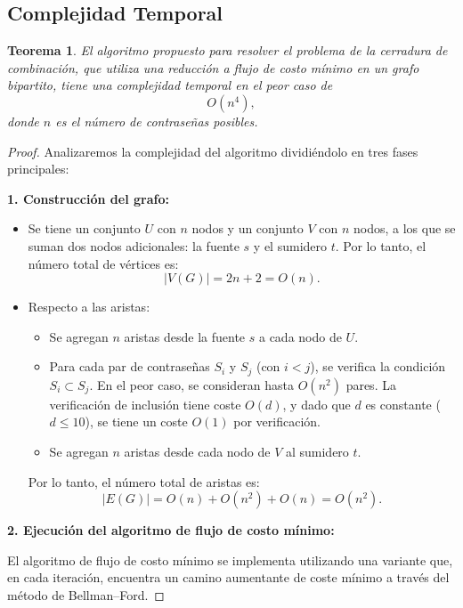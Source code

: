 ﻿\documentclass{article}
\theoremstyle{plain}
\newtheorem{theorem}{Teorema}
\theoremstyle{definition}
\begin{document}
\medskip

\subsection{Complejidad Temporal}

\begin{theorem}
El algoritmo propuesto para resolver el problema de la cerradura de combinación, que utiliza una reducción a flujo de costo mínimo en un grafo bipartito, tiene una complejidad temporal en el peor caso de 
\[
O(n^4),
\]
donde \(n\) es el número de contraseñas posibles.
\end{theorem}

\begin{proof}
Analizaremos la complejidad del algoritmo dividiéndolo en tres fases principales:

\medskip

\textbf{1. Construcción del grafo:}

\begin{itemize}
    \item Se tiene un conjunto \(U\) con \(n\) nodos y un conjunto \(V\) con \(n\) nodos, a los que se suman dos nodos adicionales: la fuente \(s\) y el sumidero \(t\). Por lo tanto, el número total de vértices es:
    \[
    |V(G)| = 2n+2 = O(n).
    \]
    \item Respecto a las aristas:
    \begin{itemize}
        \item Se agregan \(n\) aristas desde la fuente \(s\) a cada nodo de \(U\).
        \item Para cada par de contraseñas \(S_i\) y \(S_j\) (con \(i<j\)), se verifica la condición \(S_i\subset S_j\). En el peor caso, se consideran hasta \(O(n^2)\) pares. La verificación de inclusión tiene coste \(O(d)\), y dado que \(d\) es constante (\(d\le 10\)), se tiene un coste \(O(1)\) por verificación.
        \item Se agregan \(n\) aristas desde cada nodo de \(V\) al sumidero \(t\).
    \end{itemize}
    Por lo tanto, el número total de aristas es:
    \[
    |E(G)| = O(n) + O(n^2) + O(n) = O(n^2).
    \]
\end{itemize}

\medskip

\textbf{2. Ejecución del algoritmo de flujo de costo mínimo:}

El algoritmo de flujo de costo mínimo se implementa utilizando una variante que, en cada iteración, encuentra un camino aumentante de coste mínimo a través del método de Bellman--Ford.


\end{proof}
\end{document}
